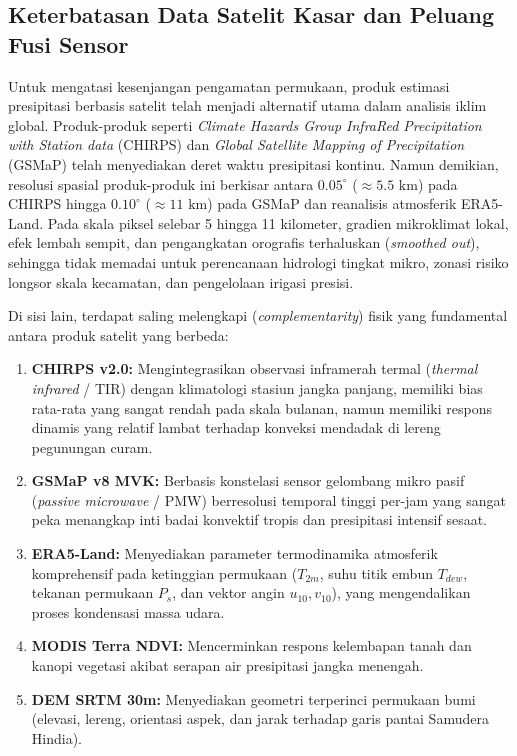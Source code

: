 \documentclass[11pt,a4paper,titlepage]{article}
\begin{document}
\subsection{Keterbatasan Data Satelit Kasar dan Peluang Fusi Sensor}
Untuk mengatasi kesenjangan pengamatan permukaan, produk estimasi presipitasi berbasis satelit telah menjadi alternatif utama dalam analisis iklim global. Produk-produk seperti \textit{Climate Hazards Group InfraRed Precipitation with Station data} (CHIRPS) dan \textit{Global Satellite Mapping of Precipitation} (GSMaP) telah menyediakan deret waktu presipitasi kontinu. Namun demikian, resolusi spasial produk-produk ini berkisar antara $0.05^\circ$ ($\approx 5.5\text{ km}$) pada CHIRPS hingga $0.10^\circ$ ($\approx 11\text{ km}$) pada GSMaP dan reanalisis atmosferik ERA5-Land. Pada skala piksel selebar 5 hingga 11 kilometer, gradien mikroklimat lokal, efek lembah sempit, dan pengangkatan orografis terhaluskan (\textit{smoothed out}), sehingga tidak memadai untuk perencanaan hidrologi tingkat mikro, zonasi risiko longsor skala kecamatan, dan pengelolaan irigasi presisi.

Di sisi lain, terdapat saling melengkapi (\textit{complementarity}) fisik yang fundamental antara produk satelit yang berbeda:
\begin{enumerate}
    \item \textbf{CHIRPS v2.0:} Mengintegrasikan observasi inframerah termal (\textit{thermal infrared} / TIR) dengan klimatologi stasiun jangka panjang, memiliki bias rata-rata yang sangat rendah pada skala bulanan, namun memiliki respons dinamis yang relatif lambat terhadap konveksi mendadak di lereng pegunungan curam.
    \item \textbf{GSMaP v8 MVK:} Berbasis konstelasi sensor gelombang mikro pasif (\textit{passive microwave} / PMW) berresolusi temporal tinggi per-jam yang sangat peka menangkap inti badai konvektif tropis dan presipitasi intensif sesaat.
    \item \textbf{ERA5-Land:} Menyediakan parameter termodinamika atmosferik komprehensif pada ketinggian permukaan ($T_{2m}$, suhu titik embun $T_{dew}$, tekanan permukaan $P_s$, dan vektor angin $u_{10}, v_{10}$), yang mengendalikan proses kondensasi massa udara.
    \item \textbf{MODIS Terra NDVI:} Mencerminkan respons kelembapan tanah dan kanopi vegetasi akibat serapan air presipitasi jangka menengah.
    \item \textbf{DEM SRTM 30m:} Menyediakan geometri terperinci permukaan bumi (elevasi, lereng, orientasi aspek, dan jarak terhadap garis pantai Samudera Hindia).
\end{enumerate}
\end{document}
